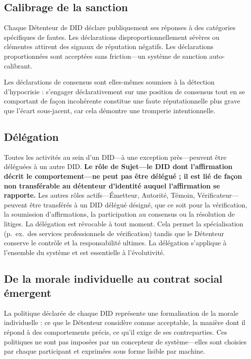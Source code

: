 \documentclass[11pt,a4paper,twocolumn]{article}
\begin{document}
\subsection{Calibrage de la sanction}

Chaque Détenteur de DID déclare publiquement ses réponses à des catégories spécifiques de fautes. Les déclarations disproportionnellement sévères ou clémentes attirent des signaux de réputation négatifs. Les déclarations proportionnées sont acceptées sans friction---un système de sanction auto-calibrant.

Les déclarations de consensus sont elles-mêmes soumises à la détection d'hypocrisie : s'engager déclarativement sur une position de consensus tout en se comportant de façon incohérente constitue une faute réputationnelle plus grave que l'écart sous-jacent, car cela démontre une tromperie intentionnelle.

\subsection{Délégation}

Toutes les activités au sein d'un DID---à une exception près---peuvent être déléguées à un autre DID. \textbf{Le rôle de Sujet---le DID dont l'affirmation décrit le comportement---ne peut pas être délégué ; il est lié de façon non transférable au détenteur d'identité auquel l'affirmation se rapporte.} Les autres rôles actifs---Émetteur, Autorité, Témoin, Vérificateur---peuvent être transférés à un DID délégué désigné, que ce soit pour la vérification, la soumission d'affirmations, la participation au consensus ou la résolution de litiges. La délégation est révocable à tout moment. Cela permet la spécialisation (p.\ ex.\ des services professionnels de vérification) tandis que le Détenteur conserve le contrôle et la responsabilité ultimes. La délégation s'applique à l'ensemble du système et est essentielle à l'évolutivité.

\subsection{De la morale individuelle au contrat social émergent}

La politique déclarée de chaque DID représente une formalisation de la morale individuelle : ce que le Détenteur considère comme acceptable, la manière dont il répond à des comportements précis, ce qu'il exige de ses contreparties. Ces politiques ne sont pas imposées par un concepteur de système---elles sont choisies par chaque participant et exprimées sous forme lisible par machine.
\end{document}
